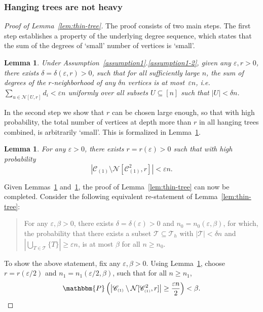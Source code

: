 \documentclass[11pt,a4paper, reqno]{article}
\numberwithin{equation}{section}
\numberwithin{equation}{section}
\def\sss{\scriptscriptstyle}
\newcommand{\prob}[1]{\ensuremath{\mathbbm{P}\left(#1\right)}}
\newcommand{\1}{\ensuremath{\mathbbm{1}}}
\newtheorem{lemma}[theorem]{Lemma}
\numberwithin{equation}{section}
\numberwithin{theorem}{section}
\begin{document}
\subsubsection{Hanging trees are not heavy}\label{sssec:notheavy} 
\begin{proof}[Proof of Lemma~\ref{lem:thin-tree}]
The proof consists of two main steps. 
The first step establishes a property of the underlying degree sequence, which states that the sum of the degrees of  `small' number of vertices is `small'.
\begin{lemma}
\label{lem:small-nbd} 
Under Assumption~\ref{assumption1}.\ref{assumption1-2}, given any $\varepsilon, r >0$, there exists $\delta = \delta(\varepsilon, r) >0$, such that for all sufficiently large $n$, the sum of degrees of the $r$-neighborhood of \emph{any} $\delta n$ vertices is at most~$\varepsilon n$, i.e. $\sum_{u\in\mathcal{N}[U,r]}d_i<\varepsilon n$ uniformly over all subsets $U\subseteq [n]$ such that $|U|< \delta n$.
\end{lemma}
In the second step we show that $r$ can be chosen large enough, so that with high probability, the total number of vertices at depth more than $r$ in all hanging trees combined, is arbitrarily `small'. This is formalized in Lemma~\ref{lem:small-hanging-trees}. 
\begin{lemma}
\label{lem:small-hanging-trees} 
For any $\varepsilon>0$, there exists $r=r(\varepsilon)>0$  such that 
with high probability 
$$\left|\mathscr{C}_{\sss (1)}\setminus\mathcal{N}[\mathscr{C}_{\sss (1)}^2,r]\right|<\varepsilon n.$$
\end{lemma}
\noindent
Given Lemmas~\ref{lem:small-nbd} and~\ref{lem:small-hanging-trees}, the proof of Lemma~\ref{lem:thin-tree} can now be completed. 
Consider the following equivalent re-statement of  Lemma~\ref{lem:thin-tree}:
\begin{quotation}
\noindent
For any $\varepsilon, \beta>0$, there exists $\delta = \delta(\varepsilon)>0$ and $n_0= n_0(\varepsilon, \beta)$, for which,
 the probability that there exists a subset $\mathcal{T}\subseteq\mathcal{T}_h$ with $|\mathcal{T}|<\delta n$ and $|\bigcup_{T\in\mathcal{T}}\{T\}|\geq \varepsilon n$, is at most $\beta$ for all $n\geq n_0$.
\end{quotation}
To show the above statement, fix any $\varepsilon, \beta>0$. 
Using Lemma~\ref{lem:small-hanging-trees}, choose $r=r(\varepsilon/2)$ and $n_1 = n_1(\varepsilon/2,\beta)$, such that for all $n\geq n_1$, 
$$\prob{\left|\mathscr{C}_{\sss (1)}\setminus\mathcal{N}[\mathscr{C}_{\sss (1)}^2,r]\right|\geq\frac{\varepsilon n}{2}}<\beta.$$

\end{proof}
\end{document}
